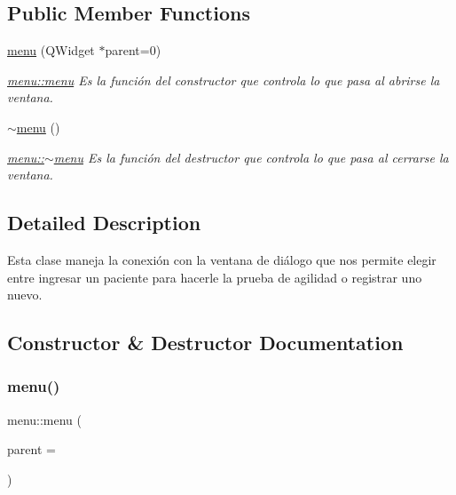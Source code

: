 \subsection*{Public Member Functions}
\begin{DoxyCompactItemize}
\item 
\hyperlink{classmenu_aff7946ea9349eacaede63417ecea19cc}{menu} (Q\+Widget $\ast$parent=0)
\begin{DoxyCompactList}\small\item\em \hyperlink{classmenu_aff7946ea9349eacaede63417ecea19cc}{menu\+::menu} Es la función del constructor que controla lo que pasa al abrirse la ventana. \end{DoxyCompactList}\item 
\hyperlink{classmenu_a5efbd22f23289b42ed68d2a9bb431f35}{$\sim$menu} ()
\begin{DoxyCompactList}\small\item\em \hyperlink{classmenu_a5efbd22f23289b42ed68d2a9bb431f35}{menu\+::$\sim$menu} Es la función del destructor que controla lo que pasa al cerrarse la ventana. \end{DoxyCompactList}\end{DoxyCompactItemize}


\subsection{Detailed Description}
Esta clase maneja la conexión con la ventana de diálogo que nos permite elegir entre ingresar un paciente para hacerle la prueba de agilidad o registrar uno nuevo. 

\subsection{Constructor \& Destructor Documentation}
\mbox{\label{classmenu_aff7946ea9349eacaede63417ecea19cc}} 
\subsubsection{\texorpdfstring{menu()}{menu()}}
{\footnotesize\ttfamily menu\+::menu (\begin{DoxyParamCaption}\item[{Q\+Widget $\ast$}]{parent = {} }\end{DoxyParamCaption})\hspace{0.3cm}{\ttfamily [explicit]}}



